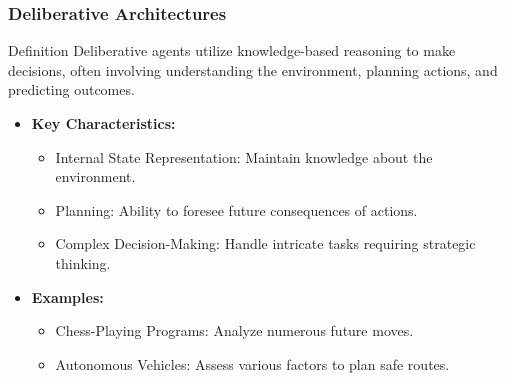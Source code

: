 \documentclass[aspectratio=169]{beamer}
\begin{document}
\begin{frame}[fragile]
    \frametitle{Deliberative Architectures}
    \begin{block}{Definition}
        Deliberative agents utilize knowledge-based reasoning to make decisions, often involving understanding the environment, planning actions, and predicting outcomes.
    \end{block}

    \begin{itemize}
        \item \textbf{Key Characteristics:}
        \begin{itemize}
            \item Internal State Representation: Maintain knowledge about the environment.
            \item Planning: Ability to foresee future consequences of actions.
            \item Complex Decision-Making: Handle intricate tasks requiring strategic thinking.
        \end{itemize}

        \item \textbf{Examples:}
        \begin{itemize}
            \item Chess-Playing Programs: Analyze numerous future moves.
            \item Autonomous Vehicles: Assess various factors to plan safe routes.
        \end{itemize}
    \end{itemize}
\end{frame}
\end{document}
